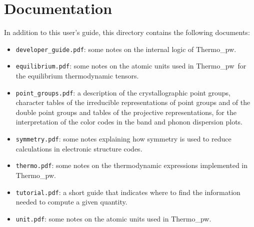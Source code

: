 \documentclass[12pt,a4paper,twoside]{report}
\def\thermo{{\sc Thermo}\_{\sc pw}}
\begin{document}
\newpage
{\color{dark-blue}\chapter{Documentation}}
\color{black}

In addition to this user's guide, this directory contains the following
documents:

\begin{itemize}

\item
\texttt{developer\_guide.pdf}: some notes on the internal logic of
\thermo.

\item
\texttt{equilibrium.pdf}: some notes on the atomic units used in 
\thermo\ for the equilibrium thermodynamic tensors.

\item
\texttt{point\_groups.pdf}: a description of the crystallographic point 
groups, character tables of the irreducible representations of point
groups and of the double point groups and tables of the projective 
representations, for the interpretation of the color codes in the band 
and phonon dispersion plots.

\item
\texttt{symmetry.pdf}: some notes explaining how symmetry is used 
to reduce calculations in electronic structure codes.

\item
\texttt{thermo.pdf}: some notes on the thermodynamic expressions implemented
in \thermo.

\item
\texttt{tutorial.pdf}: a short guide that indicates where to find the
information needed to compute a given quantity. 

\item
\texttt{unit.pdf}: some notes on the atomic units used in 
\thermo.


\end{itemize}
\end{document}
